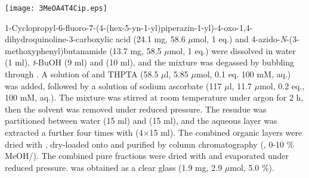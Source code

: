 
\begin{scheme}[H]
	\begin{center}
		\texttt{[image: 3MeOA4T4Cip.eps]}
	\end{center}
\end{scheme}

1-Cyclopropyl-6-fluoro-7-(4-(hex-5-yn-1-yl)piperazin-1-yl)-4-oxo-1,4\hyp{}dihydro\-quinoline-3-carboxylic acid  \allowbreak (24.1 mg, 58.6 $\mu$mol, 1 eq.) and 4\hyp{}azido\hyp{}\textit{N}\hyp{}(3\hyp{}methoxyphenyl)butanamide  (13.7 mg, 58.5 $\mu$mol, 1 eq.) were dissolved in water (1 ml), \textit{t}-BuOH (9 ml) and  (10 ml), and the mixture was degassed by bubbling through . A solution of  and THPTA (58.5 $\mu$l, 5.85 $\mu$mol, 0.1 eq. 100 mM, aq.) was added, followed by a solution of sodium ascorbate (117 $\mu$l, 11.7 $\mu$mol, 0.2 eq., 100 mM, aq.). The mixture was stirred at room temperature under argon for 2 h, then the solvent was removed under reduced pressure. The resudue was partitioned between water (15 ml) and  (15 ml), and the aqueous layer was extracted a further four times with  (4$\times$15 ml). The combined organic layers were dried with , dry-loaded onto  and purified by column chromatography (, 0-10 \% MeOH/). The combined pure fractions were dried with  and evaporated under reduced pressure.  was obtained as a clear glass (1.9 mg, 2.9 $\mu$mol, 5.0 \%).
\\[1\baselineskip]
\\[1\baselineskip]
\\[1\baselineskip]
